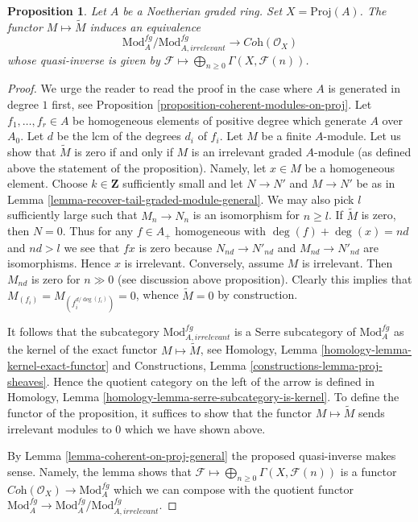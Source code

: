 \documentclass{stacks-project}
\theoremstyle{plain}
\newtheorem{proposition}[subsection]{Proposition}
\theoremstyle{definition}
\theoremstyle{remark}
\numberwithin{equation}{subsection}
\begin{document}
\begin{proposition}
\label{proposition-coherent-modules-on-proj-general}
Let $A$ be a Noetherian graded ring. Set $X = \text{Proj}(A)$. The functor
$M \mapsto \widetilde M$ induces an equivalence
$$
\text{Mod}^{fg}_A/\text{Mod}^{fg}_{A, irrelevant}
\longrightarrow
\textit{Coh}(\mathcal{O}_X)
$$
whose quasi-inverse is given by
$\mathcal{F} \longmapsto \bigoplus_{n \geq 0} \Gamma(X, \mathcal{F}(n))$.
\end{proposition}

\begin{proof}
We urge the reader to read the proof in the case where $A$
is generated in degree $1$ first, see
Proposition \ref{proposition-coherent-modules-on-proj}.
Let $f_1, \ldots, f_r \in A$ be homogeneous elements of positive degree
which generate $A$ over $A_0$. Let $d$ be the lcm of the degrees
$d_i$ of $f_i$. Let $M$ be a finite $A$-module.
Let us show that $\widetilde{M}$ is zero if and
only if $M$ is an irrelevant graded $A$-module (as defined above
the statement of the proposition). Namely, let $x \in M$ be a
homogeneous element.
Choose $k \in \mathbf{Z}$ sufficiently small and let
$N \to N'$ and $M \to N'$ be as in
Lemma \ref{lemma-recover-tail-graded-module-general}.
We may also pick $l$ sufficiently large such that
$M_n \to N_n$ is an isomorphism for $n \geq l$.
If $\widetilde{M}$ is zero, then $N = 0$.
Thus for any $f \in A_+$ homogeneous with
$\deg(f) + \deg(x) = nd$ and $nd > l$ we see that $fx$ is zero
because $N_{nd} \to N'_{nd}$ and $M_{nd} \to N'_{nd}$ are isomorphisms.
Hence $x$ is irrelevant.
Conversely, assume $M$ is irrelevant. Then $M_{nd}$ is zero
for $n \gg 0$ (see discussion above proposition).
Clearly this implies that $M_{(f_i)} = M_{(f_i^{d/\deg(f_i)})} = 0$,
whence $\widetilde{M} = 0$ by construction.

\medskip\noindent
It follows that the subcategory $\text{Mod}^{fg}_{A, irrelevant}$
is a Serre subcategory of $\text{Mod}^{fg}_A$ as the kernel
of the exact functor $M \mapsto \widetilde M$, see
Homology, Lemma \ref{homology-lemma-kernel-exact-functor}
and Constructions, Lemma \ref{constructions-lemma-proj-sheaves}.
Hence the quotient category on the left of the arrow is defined
in Homology, Lemma \ref{homology-lemma-serre-subcategory-is-kernel}.
To define the functor of the proposition, it suffices to show that
the functor $M \mapsto \widetilde M$ sends irrelevant modules to $0$
which we have shown above.

\medskip\noindent
By Lemma \ref{lemma-coherent-on-proj-general} the proposed quasi-inverse
makes sense. Namely, the lemma shows that
$\mathcal{F} \longmapsto \bigoplus_{n \geq 0} \Gamma(X, \mathcal{F}(n))$
is a functor $\textit{Coh}(\mathcal{O}_X) \to \text{Mod}^{fg}_A$
which we can compose with the quotient functor
$\text{Mod}^{fg}_A \to \text{Mod}^{fg}_A/\text{Mod}^{fg}_{A, irrelevant}$.


\end{proof}
\end{document}
